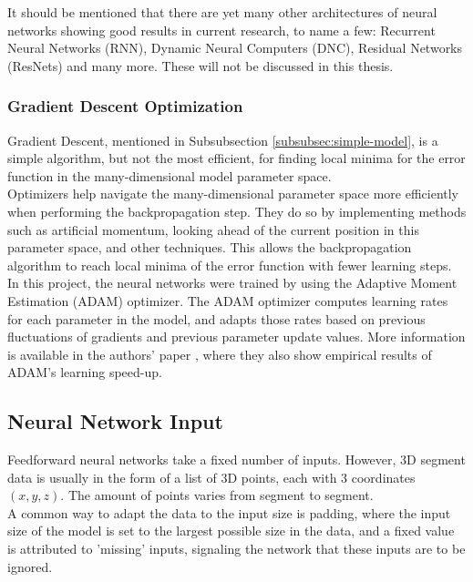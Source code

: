 It should be mentioned that there are yet many other architectures of neural networks showing good results in current research, to name a few: Recurrent Neural Networks (RNN), Dynamic Neural Computers (DNC), Residual Networks (ResNets) and many more. These will not be discussed in this thesis.\\

\subsubsection{Gradient Descent Optimization}

Gradient Descent, mentioned in Subsubsection \ref{subsubsec:simple-model}, is a simple algorithm, but not the most efficient, for finding local minima for the error function in the many-dimensional model parameter space.\\

Optimizers help navigate the many-dimensional parameter space more efficiently when performing the backpropagation step. They do so by implementing methods such as artificial momentum, looking ahead of the current position in this parameter space, and other techniques. This allows the backpropagation algorithm to reach local minima of the error function with fewer learning steps.\\

In this project, the neural networks were trained by using the Adaptive Moment Estimation (ADAM) optimizer. The ADAM optimizer computes learning rates for each parameter in the model, and adapts those rates based on previous fluctuations of gradients and previous parameter update values.  
More information is available in the authors' paper \cite{adam}, where they also show empirical results of ADAM's learning speed-up. 

\subsection{Neural Network Input}
\label{subsec:NNinput}

Feedforward neural networks take a fixed number of inputs. However, 3D segment data is usually in the form of a list of 3D points, each with 3 coordinates $(x,y,z)$. The amount of points varies from segment to segment.\\

A common way to adapt the data to the input size is padding, where the input size of the model is set to the largest possible size in the data, and a fixed value is attributed to 'missing' inputs, signaling the network that these inputs are to be ignored.\\

